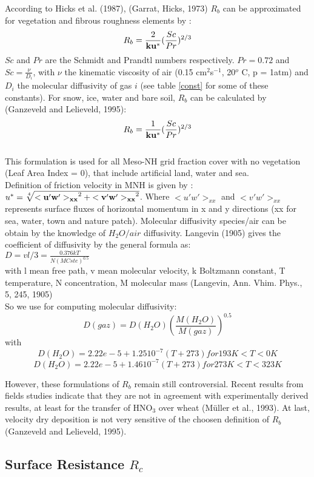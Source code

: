 According to Hicks et al. (1987), (Garrat, Hicks, 1973) 
$R_b$ can be approximated for vegetation and fibrous roughness elements by :
\[ R_b = \frac{2}{\bf{k} \bf{u^*}}(\frac{Sc}{Pr})^{2/3} \]
$Sc$ and $Pr$ are the Schmidt and Prandtl numbers respectively.
$Pr=0.72$ and $Sc=\frac{\nu}{D_i}$, with $\nu$ the kinematic viscosity of
air (0.15 cm$^2$s$^{-1}$, 20$^o$ C, p = 1atm) and $D_i$ the molecular
diffusivity of gas $i$ (see table \ref{const} for some of these
constants). 
For snow, ice, water and bare soil, $R_b$ can be calculated by (Ganzeveld and Lelieveld, 1995):\[ R_b =
\frac{1}{\bf{k} \bf{u^*}}(\frac{Sc}{Pr})^{2/3} \]\\
This formulation is used for all Meso-NH grid fraction cover with no
vegetation (Leaf Area Index = 0), that include artificial land, water
and sea.\\
Definition of friction velocity in MNH is given by : $u^* =
\sqrt[4]{{\bf {<u'w'>}_{xx}}^2+{\bf{<v'w'>}_{xx}}^2}$. Where $<u'w'>_{xx}$ and
$<v'w'>_{xx}$ represents   
surface fluxes of horizontal momentum in x and y directions (xx for sea,
water, town and nature patch).
Molecular diffusivity species/air  can be obtain by the knowledge of $H_2O/air$ diffusivity.
Langevin (1905) gives the coefficient of diffusivity by the general formula as:\\
$D = v l /3 = \frac{0.376 k T}{N (M Cste)^{0.5}}$\\
with
l mean free path,
v mean molecular velocity,
k Boltzmann constant,
T temperature,
N concentration,
M molecular mass
(Langevin, Ann. Vhim. Phys., 5, 245, 1905)\\
So we use for computing molecular diffusivity: \\ 
$$
D(gaz)=D(H_2O) \left(\frac{M(H_2O)}{M(gaz)} \right)^{0.5}
$$
with 
$$
D(H_2O)= 2.22e-5 + 1.25 10^{-7} (T + 273)  for 193 K < T < 0 K
$$
$$
D(H_2O)= 2.22e-5 + 1.46 10^{-7} (T + 273)  for 273 K < T < 323 K 
$$

\medskip

However, these formulations of $R_b$ remain still controversial. 
Recent results from fields studies 
indicate that they
are not in agreement with experimentally derived results, at least
for the transfer of HNO$_3$
over wheat (M\"uller et al., 1993).
At last, velocity dry deposition is not very sensitive of the choosen
definition of $R_b$ (Ganzeveld and Lelieveld, 1995).
\subsection{Surface Resistance $R_c$}

